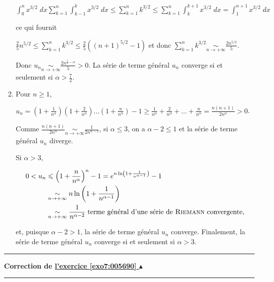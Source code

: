 \documentclass[11pt,a4paper]{article}
\newcounter{exo}
\newcommand{\correction}[1]{\hypertarget{cor7:#1}{}\label{cor7:#1}{\bf Correction de \hyperlink{exo7:#1}{l'exercice \ref{exo7:#1} $\blacktriangle$}}\vspace{1mm}\hrule\vspace{1mm}}
\newcommand{\fincorrection}{\vspace{1mm}\hrule\vspace*{7mm}}
\begin{document}
\begin{enumerate}
\begin{center}
$\int_{0}^{n}x^{3/2}\;dx\sum_{k=1}^{n}\int_{k-1}^{k}x^{3/2}\;dx\leqslant\sum_{k=1}^{n}k^{3/2}\leqslant\sum_{k=1}^{n}\int_{k}^{k+1}x^{3/2}\;dx=\int_{1}^{n+1}x^{3/2}\;dx$
\end{center}

ce qui fournit

\begin{center}
$\frac{2}{5}n^{5/2}\leqslant\sum_{k=1}^{n}k^{3/2}\leqslant\frac{2}{5}((n+1)^{5/2}-1)$ et donc $\sum_{k=1}^{n}k^{3/2}\underset{n\rightarrow+\infty}{\sim}\frac{2n^{5/2}}{5}$.
\end{center}

Donc $u_n\underset{n\rightarrow+\infty}{\sim}\frac{2n^{\frac{5}{2}-\alpha}}{5}>0$. La série de terme général $u_n$ converge si et seulement si $\alpha>\frac{7}{2}$.

\item  Pour $n\geqslant1$,

\begin{center}
$u_n =\left(1+\frac{1}{n^\alpha}\right)\left(1+\frac{2}{n^\alpha}\right)\ldots\left(1+\frac{n}{n^\alpha}\right)-1\geqslant\frac{1}{n^\alpha}+\frac{2}{n^\alpha}+\ldots+\frac{n}{n^\alpha}=\frac{n(n+1)}{2n^\alpha}>0$.
\end{center}

Comme $\frac{n(n+1)}{2n^\alpha}\underset{n\rightarrow+\infty}{\sim}\frac{1}{2n^{\alpha-2}}$, si $\alpha\leqslant3$, on a $\alpha-2\leqslant1$ et la série de terme général $u_n$ diverge.

Si $\alpha> 3$,

\begin{align*}\ensuremath
0 < u_n&\leqslant\left(1+\frac{n}{n^\alpha}\right)^n -1= e^{n\ln\left(1+\frac{1}{n^{\alpha-1}}\right)}-1\\
 &\underset{n\rightarrow+\infty}{\sim}n\ln\left(1+\frac{1}{n^{\alpha-1}}\right)\\
 &\underset{n\rightarrow+\infty}{\sim}\frac{1}{n^{\alpha-2}}\;\text{terme général d'une série de \textsc{Riemann} convergente},
\end{align*}
			   
			   
et, puisque $\alpha-2>1$,  la série de terme général $u_n$ converge. Finalement, la série de terme général $u_n$ converge si et seulement si $\alpha > 3$.
\end{enumerate}
\fincorrection
\correction{005690}
\end{document}
